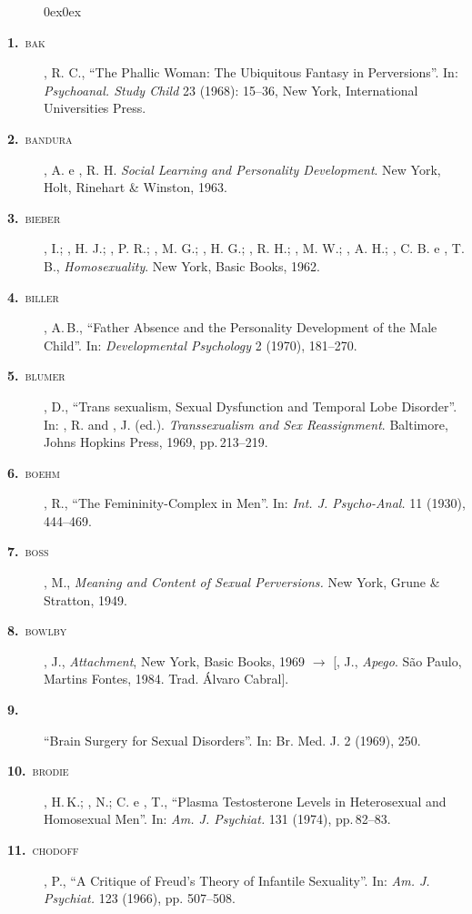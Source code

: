 \begin{description}0ex\parsep0ex\footnotesize{}
\renewcommand{\tit}[2]{\item[\textbf{#1}~\textnormal{\textsc{\MakeTextLowercase{#2}}}]}
\renewcommand{\titidem}[1]{\item[\textbf{#1}~\line(1,0){25}]}

\tit{1.}{Bak}, R. C., ``The Phallic Woman: The Ubiquitous Fantasy in
Perversions''. In: \textit{Psychoanal. Study Child} 23 (1968):
15--36, New York, International Universities Press.

\tit{2.}{Bandura}, A. e , R. H. \textit{Social Learning and Personality
Development}. New York, Holt, Rinehart \& Winston, 1963.

\tit{3.}{Bieber}, I.; , H. J.; , P. R.; , M. 
G.; , H. G.; ,
R. H.; , M. W.; , A. H.; , C. B. e , T. B.,
\textit{Homosexuality}. New York, Basic Books, 1962.

\tit{4.}{Biller}, A.\,B., ``Father Absence and the Personality Development of
the Male Child''. In: \textit{Developmental Psychology} 2 (1970),
181--270.

\tit{5.}{Blumer}, D., ``Trans sexualism, Sexual Dysfunction and Temporal
Lobe Disorder''. In: , R. and , J. (ed.). 
\textit{Transsexualism and Sex Reassignment}. 
Baltimore, Johns Hopkins Press, 1969, pp.\,213--219.

\tit{6.}{Boehm}, R., ``The Femininity-Complex in Men''. In:
\textit{Int. J. Psycho-Anal. }11 (1930), 444--469.

\tit{7.}{Boss}, M., \textit{Meaning and Content of Sexual Perversions. }New York, Grune \&
Stratton, 1949.

\tit{8.}{Bowlby}, J., \textit{Attachment}, New York, Basic Books, 1969 {$\bm{\rightarrow}$} [, J.,
\textit{Apego}. São Paulo, Martins Fontes, 1984. Trad. Álvaro Cabral].

\tit{9.}{} ``Brain Surgery for Sexual Disorders''. In: Br. Med. J. 2
(1969), 250.

\tit{10.}{Brodie}, H.\,K.; , N.;  C. e , T., ``Plasma
Testosterone Levels in Heterosexual and Homosexual Men''. In: \textit{Am.
J. Psychiat.} 131 (1974), pp.\,82--83.

\tit{11.}{Chodoff}, P., ``A Critique of Freud's Theory of
Infantile Sexuality''. In: \textit{Am. J. Psychiat. }123 (1966), pp.
507--508.


\end{description}

